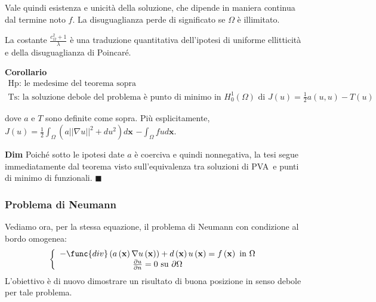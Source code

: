 \documentclass{article}
\begin{document}
Vale quindi esistenza e unicit\`{a} della soluzione, che dipende in maniera
continua dal termine noto $f$. La disuguaglianza perde di significato se $%
\Omega $ \`{e} illimitato.

La costante $\frac{c_{\Omega }^{2}+1}{\lambda }$ \`{e} una traduzione
quantitativa dell'ipotesi di uniforme ellitticit\`{a} e della disuguaglianza
di Poincar\'{e}.

\textbf{Corollario}%
\begin{gather*}
\text{Hp: le medesime del teorema sopra} \\
\text{Ts: la soluzione debole del problema \`{e} punto di minimo in }%
H_{0}^{1}\left( \Omega \right) \text{ di }J\left( u\right) =\frac{1}{2}%
a\left( u,u\right) -T\left( u\right)
\end{gather*}

dove $a$ e $T$ sono definite come sopra. Pi\`{u} esplicitamente, $J\left(
u\right) =\frac{1}{2}\int_{\Omega }\left( a\left\vert \left\vert \nabla
u\right\vert \right\vert ^{2}+du^{2}\right) d\mathbf{x}$ $-\int_{\Omega }fud%
\mathbf{x}$.

\textbf{Dim} Poich\'{e} sotto le ipotesi date $a$ \`{e} coerciva e quindi
nonnegativa, la tesi segue immediatamente dal teorema visto sull'equivalenza
tra soluzioni di PVA\ e punti di minimo di funzionali. $\blacksquare $

\subsubsection{Problema di Neumann}

Vediamo ora, per la stessa equazione, il problema di Neumann con condizione
al bordo omogenea: 
\begin{equation*}
\left\{ 
\begin{array}{c}
-\func{div}\left( a\left( \mathbf{x}\right) \nabla u\left( \mathbf{x}\right)
\right) +d\left( \mathbf{x}\right) u\left( \mathbf{x}\right) =f\left( 
\mathbf{x}\right) \text{ in }\Omega \\ 
\frac{\partial u}{\partial n}=0\text{ su }\partial \Omega%
\end{array}%
\right. 
\end{equation*}
L'obiettivo \`{e} di nuovo dimostrare un risultato di buona
posizione in senso debole per tale problema.
\end{document}
